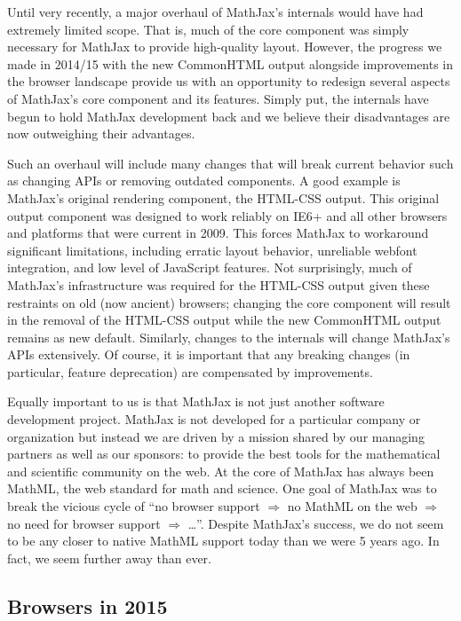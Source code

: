 \documentclass[]{amsart}
\begin{document}
Until very recently, a major overhaul of MathJax's internals would have
had extremely limited scope. That is, much of the core component was
simply necessary for MathJax to provide high-quality layout. However,
the progress we made in 2014/15 with the new CommonHTML output alongside
improvements in the browser landscape provide us with an opportunity to
redesign several aspects of MathJax's core component and its features.
Simply put, the internals have begun to hold MathJax development back
and we believe their disadvantages are now outweighing their advantages.

Such an overhaul will include many changes that will break current
behavior such as changing APIs or removing outdated components. A good
example is MathJax's original rendering component, the HTML-CSS output.
This original output component was designed to work reliably on IE6+ and
all other browsers and platforms that were current in 2009. This forces
MathJax to workaround significant limitations, including erratic layout
behavior, unreliable webfont integration, and low level of JavaScript
features. Not surprisingly, much of MathJax's infrastructure was
required for the HTML-CSS output given these restraints on old (now
ancient) browsers; changing the core component will result in the
removal of the HTML-CSS output while the new CommonHTML output remains
as new default. Similarly, changes to the internals will change
MathJax's APIs extensively. Of course, it is important that any breaking
changes (in particular, feature deprecation) are compensated by
improvements.

Equally important to us is that MathJax is not just another software
development project. MathJax is not developed for a particular company
or organization but instead we are driven by a mission shared by our
managing partners as well as our sponsors: to provide the best tools for
the mathematical and scientific community on the web. At the core of
MathJax has always been MathML, the web standard for math and science.
One goal of MathJax was to break the vicious cycle of ``no browser
support $\Rightarrow$ no MathML on the web $\Rightarrow$ no need for browser support $\Rightarrow$
\ldots{}''. Despite MathJax's success, we do not seem to be any closer
to native MathML support today than we were 5 years ago. In fact, we
seem further away than ever.

\subsection{Browsers in 2015}\label{browsers-in-2015}
\end{document}
